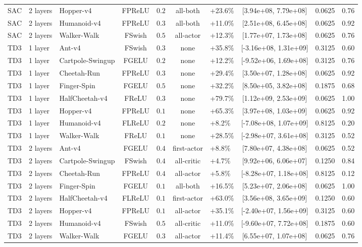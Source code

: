 \begin{table}[t]
\begin{tabularx}{\textwidth}{lllccclccc}
SAC & 2 layers & Hopper-v4 & FPReLU & $0.2$ & all-both & +23.6\% & [3.94e+08, 7.79e+08] & 0.0625 & 0.76 \\
SAC & 2 layers & Humanoid-v4 & FPReLU & $0.3$ & all-both & +11.0\% & [2.51e+08, 6.45e+08] & 0.0625 & 0.92 \\
SAC & 2 layers & Walker-Walk & FSwish & $0.5$ & all-actor & +12.3\% & [1.77e+07, 1.73e+08] & 0.0625 & 0.76 \\
TD3 & 1 layer & Ant-v4 & FSwish & $0.3$ & none & +35.8\% & [-3.16e+08, 1.31e+09] & 0.3125 & 0.60 \\
TD3 & 1 layer & Cartpole-Swingup & FGELU & $0.2$ & none & +12.2\% & [-9.52e+06, 1.69e+08] & 0.3125 & 0.76 \\
TD3 & 1 layer & Cheetah-Run & FPReLU & $0.3$ & none & +29.4\% & [3.50e+07, 1.28e+08] & 0.0625 & 0.92 \\
TD3 & 1 layer & Finger-Spin & FGELU & $0.5$ & none & +32.2\% & [8.50e+05, 3.82e+08] & 0.1875 & 0.68 \\
TD3 & 1 layer & HalfCheetah-v4 & FReLU & $0.3$ & none & +79.7\% & [1.12e+09, 2.53e+09] & 0.0625 & 1.00 \\
TD3 & 1 layer & Hopper-v4 & FPReLU & $0.1$ & none & +65.3\% & [3.97e+08, 1.03e+09] & 0.0625 & 0.92 \\
TD3 & 1 layer & Humanoid-v4 & FLReLU & $0.2$ & none & +8.2\% & [-7.08e+08, 1.07e+09] & 0.8125 & 0.20 \\
TD3 & 1 layer & Walker-Walk & FReLU & $0.1$ & none & +28.5\% & [-2.98e+07, 3.61e+08] & 0.3125 & 0.52 \\
TD3 & 2 layers & Ant-v4 & FGELU & $0.4$ & first-actor & +8.8\% & [7.80e+07, 4.38e+08] & 0.0625 & 0.52 \\
TD3 & 2 layers & Cartpole-Swingup & FSwish & $0.4$ & all-critic & +4.7\% & [9.92e+06, 6.06e+07] & 0.1250 & 0.84 \\
TD3 & 2 layers & Cheetah-Run & FPReLU & $0.4$ & all-actor & +5.8\% & [-8.28e+07, 1.18e+08] & 0.8125 & 0.12 \\
TD3 & 2 layers & Finger-Spin & FGELU & $0.1$ & all-both & +16.5\% & [5.23e+07, 2.06e+08] & 0.0625 & 1.00 \\
TD3 & 2 layers & HalfCheetah-v4 & FLReLU & $0.1$ & first-actor & +63.0\% & [3.56e+08, 3.65e+09] & 0.1250 & 0.60 \\
TD3 & 2 layers & Hopper-v4 & FPReLU & $0.1$ & all-actor & +35.1\% & [-2.40e+07, 1.56e+09] & 0.3125 & 0.60 \\
TD3 & 2 layers & Humanoid-v4 & FSwish & $0.5$ & all-critic & +11.0\% & [-9.60e+07, 7.72e+08] & 0.1875 & 0.60 \\
TD3 & 2 layers & Walker-Walk & FGELU & $0.3$ & all-actor & +11.4\% & [6.55e+07, 1.07e+08] & 0.0625 & 0.76 \\
\bottomrule
\end{tabularx}
\end{table}
